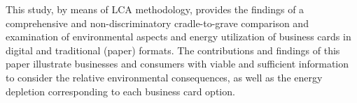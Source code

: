 \documentclass[conference]{IEEEtran}
\begin{document}
This study, by means of LCA methodology, provides the findings of a comprehensive and non-discriminatory cradle-to-grave comparison and examination of environmental aspects and energy utilization of business cards in digital and traditional (paper) formats. The contributions and findings of this paper illustrate businesses and consumers with viable and sufficient information to consider the relative environmental consequences, as well as the energy depletion corresponding to each business card option.

\end{document}
